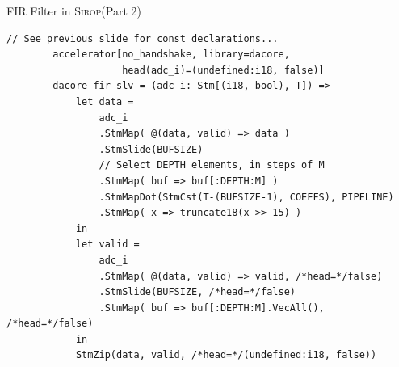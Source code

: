\documentclass[fleqn]{beamer}
\newcommand{\ourlang}{\textsc{Sirop}\xspace}
\begin{document}
\begin{frame}[fragile]{FIR Filter in \ourlang (Part 2)}
    \begin{lstlisting}[gobble=8]
        // See previous slide for const declarations...
        accelerator[no_handshake, library=dacore,
                    head(adc_i)=(undefined:i18, false)]
        dacore_fir_slv = (adc_i: Stm[(i18, bool), T]) =>
            let data =
                adc_i
                .StmMap( @(data, valid) => data )
                .StmSlide(BUFSIZE)
                // Select DEPTH elements, in steps of M
                .StmMap( buf => buf[:DEPTH:M] )
                .StmMapDot(StmCst(T-(BUFSIZE-1), COEFFS), PIPELINE)
                .StmMap( x => truncate18(x >> 15) )
            in
            let valid =
                adc_i
                .StmMap( @(data, valid) => valid, /*head=*/false)
                .StmSlide(BUFSIZE, /*head=*/false)
                .StmMap( buf => buf[:DEPTH:M].VecAll(), /*head=*/false)
            in
            StmZip(data, valid, /*head=*/(undefined:i18, false))
    \end{lstlisting}
\end{frame}
\end{document}
